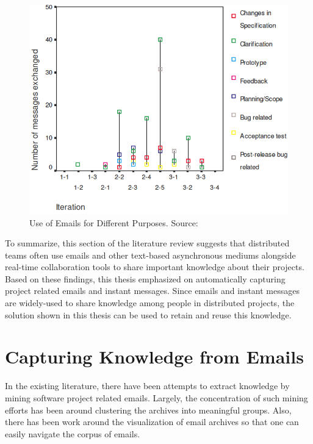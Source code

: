 \begin{figure}[bt]
	\centering
	\includegraphics[width=\textwidth]{Layman.png}
    \caption{Use of Emails for Different Purposes. Source: \cite{essential_communication}}
	\label{fig:layman}
\end{figure}

To summarize, this section of the literature review suggests that distributed teams often use emails and other text-based asynchronous mediums alongside real-time collaboration tools to share important knowledge about their projects. Based on these findings, this thesis emphasized on automatically capturing project related emails and instant messages. Since emails and instant messages are widely-used to share knowledge among people in distributed projects, the solution shown in this thesis can be used to retain and reuse this knowledge.

\section{Capturing Knowledge from Emails}
In the existing literature, there have been attempts to extract knowledge by mining software project related emails. Largely, the concentration of such mining efforts has been around clustering the archives into meaningful groups. Also, there has been work around the visualization of email archives so that one can easily navigate the corpus of emails.

